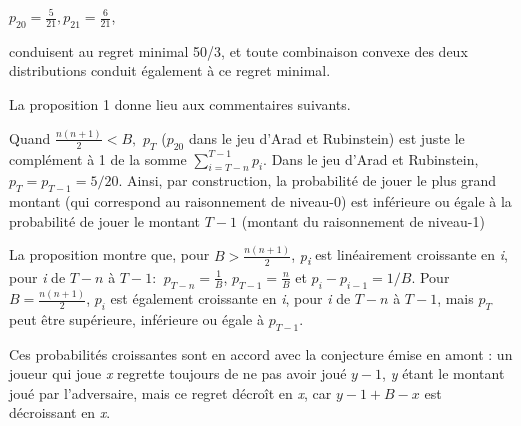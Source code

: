 \begin{Article}
\begin{refsection}[UmbhauerFR]
{\centering $p_{20} = \frac{5}{21}, p_{21} = \frac{6}{21}$,\par}

\noindent conduisent au regret minimal 50/3, et toute combinaison convexe des deux
distributions conduit également à ce regret minimal.

La proposition 1 donne lieu aux commentaires suivants.

Quand \(\frac{n(n + 1)}{2} < B,\) $p_T$
($p_20$ dans le jeu d'Arad et Rubinstein) est juste
le complément à 1 de la somme \(\sum_{i = T - n}^{T - 1}p_{i}\). Dans le
jeu d'Arad et Rubinstein, $p_T = p_{T-1} = 5/20$. Ainsi, par construction, la
probabilité de jouer le plus grand montant (qui correspond au
raisonnement de niveau-0) est inférieure ou égale à la probabilité de
jouer le montant \(T - 1\) (montant du raisonnement de niveau-1)

La proposition montre que, pour \(B > \frac{n(n + 1)}{2}\),
\emph{p\textsubscript{i}} est linéairement croissante en \emph{i}, pour
\emph{i} de \(T - n\) à \(T - 1\): $\ p_{T - n} = \frac{1}{B}$, $p_{T - 1} = \frac{n}{B}$ et $p_{i} - p_{i - 1} = 1/B$. Pour \(B = \frac{n(n + 1)}{2}\), $p_i$ est également croissante en \emph{i}, pour \emph{i} de \(T - n\) à \(T - 1\), mais $p_T$ peut être supérieure,
inférieure ou égale à $p_{T-1}$.

Ces probabilités croissantes sont en accord avec la conjecture émise en
amont : un joueur qui joue \emph{x} regrette toujours de ne pas avoir
joué \(y - 1\), \emph{y} étant le montant joué par l'adversaire, mais ce
regret décroît en \emph{x}, car \(y - 1 + B - x\) est décroissant en
\emph{x}.


\end{refsection}
\end{Article}

